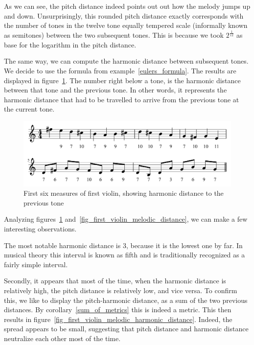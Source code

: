 \documentclass[a4paper]{book}
\theoremstyle{definition}
\begin{document}
As we can see, the pitch distance indeed points out out how the melody jumps up and down.
Unsurprisingly, this rounded pitch distance exactly corresponds with the number of tones in the twelve tone equally tempered scale (informally known as semitones) between the two subsequent tones.
This is because we took $2^\frac{1}{12}$ as base for the logarithm in the pitch distance.

The same way, we can compute the harmonic distance between subsequent tones.
We decide to use the formula from example~\ref{eulers_formula}.
The results are displayed in figure~\ref{fig_first_violin_harmonic_distance}.
The number right below a tone, is the harmonic distance between that tone and the previous tone.
In other words, it represents the harmonic distance that had to be travelled to arrive from the previous tone at the current tone.

\begin{figure}[H]
    \centering
    \includegraphics[scale=0.25]{figures/fig_first_violin_harmonic_distance.png}
    \caption{First six measures of first violin, showing harmonic distance to the previous tone}
    \label{fig_first_violin_harmonic_distance}
\end{figure}

Analyzing figures~\ref{fig_first_violin_harmonic_distance} and~\ref{fig_first_violin_melodic_distance}, we can make a few interesting observations.


The most notable harmonic distance is 3, because it is the lowest one by far.
In musical theory this interval is known as fifth and is traditionally recognized as a fairly simple interval.

Secondly, it appears that most of the time, when the harmonic distance is relatively high, the pitch distance is relatively low, and vice versa.
To confirm this, we like to display the pitch-harmonic distance, as a sum of the two previous distances.
By corollary~\ref{sum_of_metrics} this is indeed a metric.
This then results in figure~\ref{fig_first_violin_melodic_harmonic_distance}.
Indeed, the spread appears to be small, suggesting that pitch distance and harmonic distance neutralize each other most of the time.
\end{document}

